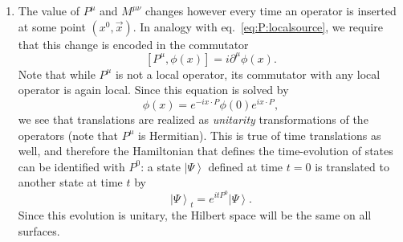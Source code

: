 \documentclass[a4paper,12pt]{article}
\newcommand{\ket}[1]{\left| #1 \right\rangle}
\numberwithin{equation}{section}
\begin{document}
\begin{enumerate}
\item
The value of $P^\mu$ and $M^{\mu\nu}$ changes however every time an operator is inserted at some point $(x^0, \vec{x})$. In analogy with eq.~\eqref{eq:P:localsource}, we require that this change is encoded in the commutator
\begin{equation}
	\left[ P^\mu, \phi(x) \right] = i \partial^\mu \phi(x).
	\label{eq:commutator:P}
\end{equation}
Note that while $P^\mu$ is not a local operator, its commutator with any local operator is again local.
Since this equation is solved by
\begin{equation}
	\phi(x) = e^{-i x \cdot P} \phi(0) e^{i x \cdot P},
	\label{eq:P:exponentiated}
\end{equation}
we see that translations are realized as \emph{unitarity} transformations of the operators (note that $P^\mu$ is Hermitian).
This is true of time translations as well, and therefore the Hamiltonian that defines the time-evolution of states can be identified with $P^0$: a state $\ket{\Psi}$ defined at time $t = 0$ is translated to another state at time $t$ by 
\begin{equation}
	\ket{ \Psi}_t = e^{i t P^0} \ket{ \Psi}.
\end{equation}
Since this evolution is unitary, the Hilbert space will be the same on all surfaces.


\end{enumerate}
\end{document}
